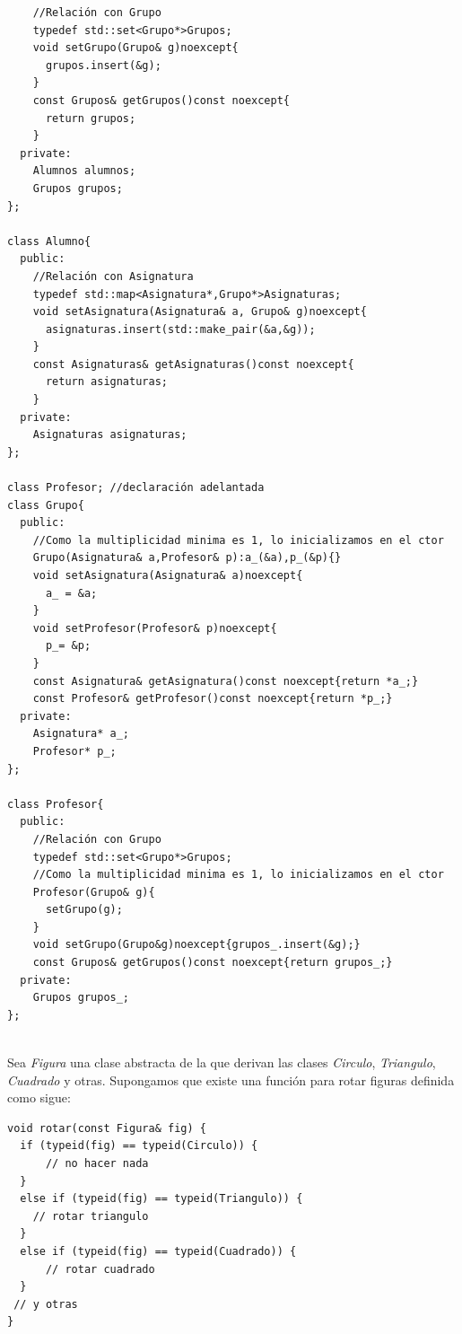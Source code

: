 \begin{enumerate}[label = \alph*)]
\begin{verbatim}
    //Relación con Grupo
    typedef std::set<Grupo*>Grupos;
    void setGrupo(Grupo& g)noexcept{
      grupos.insert(&g);
    }
    const Grupos& getGrupos()const noexcept{
      return grupos;
    }
  private:
    Alumnos alumnos;
    Grupos grupos;
};

class Alumno{
  public:
    //Relación con Asignatura
    typedef std::map<Asignatura*,Grupo*>Asignaturas;
    void setAsignatura(Asignatura& a, Grupo& g)noexcept{
      asignaturas.insert(std::make_pair(&a,&g));
    }
    const Asignaturas& getAsignaturas()const noexcept{
      return asignaturas;
    }
  private:
    Asignaturas asignaturas;
};

class Profesor; //declaración adelantada
class Grupo{
  public:
    //Como la multiplicidad minima es 1, lo inicializamos en el ctor
    Grupo(Asignatura& a,Profesor& p):a_(&a),p_(&p){}
    void setAsignatura(Asignatura& a)noexcept{
      a_ = &a;
    }
    void setProfesor(Profesor& p)noexcept{
      p_= &p;
    }
    const Asignatura& getAsignatura()const noexcept{return *a_;}
    const Profesor& getProfesor()const noexcept{return *p_;}
  private:
    Asignatura* a_;
    Profesor* p_;
};

class Profesor{
  public:
    //Relación con Grupo
    typedef std::set<Grupo*>Grupos;
    //Como la multiplicidad minima es 1, lo inicializamos en el ctor
    Profesor(Grupo& g){
      setGrupo(g);
    }
    void setGrupo(Grupo&g)noexcept{grupos_.insert(&g);}
    const Grupos& getGrupos()const noexcept{return grupos_;}
  private:
    Grupos grupos_;
};
  
\end{verbatim}
\end{enumerate}

 Sea \textit{Figura} una clase abstracta de la que derivan las clases \textit{Circulo}, \textit{Triangulo}, \textit{Cuadrado} y otras. Supongamos que existe una función para rotar figuras definida como sigue:
\begin{center}
  \begin{lstlisting}[frame = single]
void rotar(const Figura& fig) {
  if (typeid(fig) == typeid(Circulo)) { 
      // no hacer nada
  }
  else if (typeid(fig) == typeid(Triangulo)) {
    // rotar triangulo
  }
  else if (typeid(fig) == typeid(Cuadrado)) {
      // rotar cuadrado
  }
 // y otras
}
  \end{lstlisting}
\end{center}

